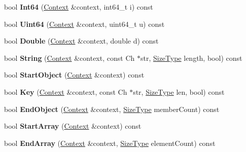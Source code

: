 \begin{DoxyCompactItemize}
bool {\bfseries Int64} (\hyperlink{structinternal_1_1_schema_validation_context}{Context} \&context, int64\+\_\+t i) const
\item 
\mbox{\label{classinternal_1_1_schema_a1f80b1a9502b71530a98694e7b54987d}} 
bool {\bfseries Uint64} (\hyperlink{structinternal_1_1_schema_validation_context}{Context} \&context, uint64\+\_\+t u) const
\item 
\mbox{\label{classinternal_1_1_schema_a8336bcea8d0e802c4b070da18e04f1dd}} 
bool {\bfseries Double} (\hyperlink{structinternal_1_1_schema_validation_context}{Context} \&context, double d) const
\item 
\mbox{\label{classinternal_1_1_schema_a8e652cbc67fa34181c3fd813c38d5280}} 
bool {\bfseries String} (\hyperlink{structinternal_1_1_schema_validation_context}{Context} \&context, const Ch $\ast$str, \hyperlink{rapidjson_8h_a5ed6e6e67250fadbd041127e6386dcb5}{Size\+Type} length, bool) const
\item 
\mbox{\label{classinternal_1_1_schema_a124c90c0b46d8a06ae5c0314467b6363}} 
bool {\bfseries Start\+Object} (\hyperlink{structinternal_1_1_schema_validation_context}{Context} \&context) const
\item 
\mbox{\label{classinternal_1_1_schema_abdd4db48f1b6deb7881777ddc539709a}} 
bool {\bfseries Key} (\hyperlink{structinternal_1_1_schema_validation_context}{Context} \&context, const Ch $\ast$str, \hyperlink{rapidjson_8h_a5ed6e6e67250fadbd041127e6386dcb5}{Size\+Type} len, bool) const
\item 
\mbox{\label{classinternal_1_1_schema_a5f74464dae5d41d5cbf626c8d6729d8a}} 
bool {\bfseries End\+Object} (\hyperlink{structinternal_1_1_schema_validation_context}{Context} \&context, \hyperlink{rapidjson_8h_a5ed6e6e67250fadbd041127e6386dcb5}{Size\+Type} member\+Count) const
\item 
\mbox{\label{classinternal_1_1_schema_a094fbac3c04493aae304ef3011866f34}} 
bool {\bfseries Start\+Array} (\hyperlink{structinternal_1_1_schema_validation_context}{Context} \&context) const
\item 
\mbox{\label{classinternal_1_1_schema_a7cae24caa7c2de31e7c5c07d23c737b3}} 
bool {\bfseries End\+Array} (\hyperlink{structinternal_1_1_schema_validation_context}{Context} \&context, \hyperlink{rapidjson_8h_a5ed6e6e67250fadbd041127e6386dcb5}{Size\+Type} element\+Count) const
\end{DoxyCompactItemize}
